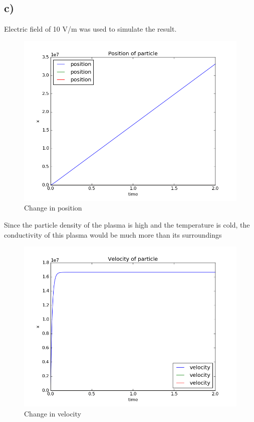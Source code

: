 \documentclass[11pt, a4paper]{article}
\begin{document}
\subsection{c)}
Electric field of 10 V/m was used to simulate the result.
\begin{figure}[H]
 \centering
 \includegraphics[scale = 0.6]{ques2c_pos.png}
 \caption{Change in position}
\end{figure}
Since the particle density of the plasma is high and the temperature is cold, the conductivity of this plasma would be much more than its surroundings


\begin{figure}[H]
 \centering
 \includegraphics[scale = 0.6]{ques2c_vel.png}
 \caption{Change in velocity}
\end{figure}
\end{document}

